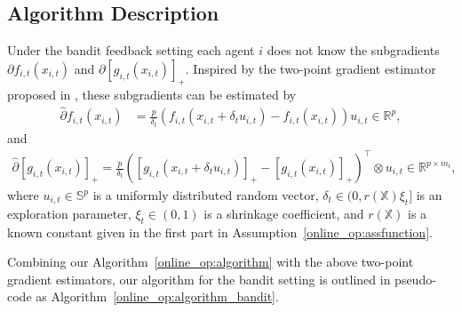 \documentclass[12pt,draftcls,onecolumn]{IEEEtran}%
\begin{document}
\subsection{Algorithm Description}
Under the bandit feedback setting each agent $i$ does not know the subgradients $\partial f_{i,t}(x_{i,t})$ and $\partial [g_{i,t}(x_{i,t})]_+$. Inspired by the two-point gradient estimator proposed in \cite{agarwal2010optimal,shamir2017optimal}, these subgradients can be estimated by
\begin{align*}
	\hat{\partial}f_{i,t}(x_{i,t})
	&=\frac{p}{\delta_{t}}(f_{i,t}(x_{i,t}+\delta_{t}u_{i,t})
	-f_{i,t}(x_{i,t}))u_{i,t}\in\mathbb{R}^{p},
\end{align*}
and
\begin{align*}
	\hat{\partial}[g_{i,t}(x_{i,t})]_+
	=\frac{p}{\delta_{t}}([g_{i,t}(x_{i,t}+\delta_{t}u_{i,t})]_+-[g_{i,t}(x_{i,t})]_+)^\top\otimes u_{i,t}\in\mathbb{R}^{p\times m_i},
\end{align*}
where $u_{i,t}\in\mathbb{S}^p$ is a uniformly distributed random vector, $\delta_t\in(0,r(\mathbb{X})\xi_{t}]$ is an exploration parameter, $\xi_t\in(0,1)$ is a shrinkage coefficient, and $r(\mathbb{X})$ is a known constant given in the first part in Assumption~\ref{online_op:assfunction}.

Combining our Algorithm~\ref{online_op:algorithm} with the above two-point gradient estimators, our algorithm for the bandit setting is outlined in pseudo-code as Algorithm~\ref{online_op:algorithm_bandit}.
\end{document}
